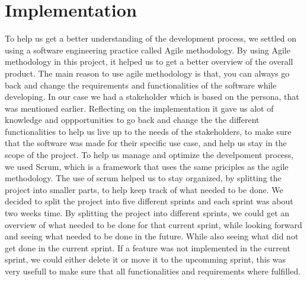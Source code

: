 \section{Implementation}
To help us get a better understanding of the development process, we settled on using a software engineering practice called Agile methodology. By using Agile methodology in this project, it helped us to get a better overview of the overall product. The main reason to use agile methodology is that, you can always go back and change the requirements and functionalities of the software while developing.
In our case we had a stakeholder which is based on the persona, that was mentioned earlier. \newline
Reflecting on the implementation it gave us alot of knowledge and oppportunities to go back and change the the different functionalities to help us live up to the needs of the stakeholders, to make sure that the software was made for their specific use case, and help us stay in the scope of the project. \newline
To help us manage and optimize the develpoment process, we used Scrum, which is a framework that uses the same priciples as the agile methodology. The use of scrum helped us to stay organized, by splitting the project into smaller parts, to help keep track of what needed to be done.
We decided to split the project into five different sprints and each sprint was about two weeks time. By splitting the project into different sprints, we could get an overview of what needed to be done for that current sprint, while looking forward and seeing what needed to be done in the future.
While also seeing what did not get done in the current sprint. If a feature was not implemented in the current sprint, we could either delete it or move it to the upcomming sprint, this was very usefull to make sure that all functionalities and requirements where fulfilled.

